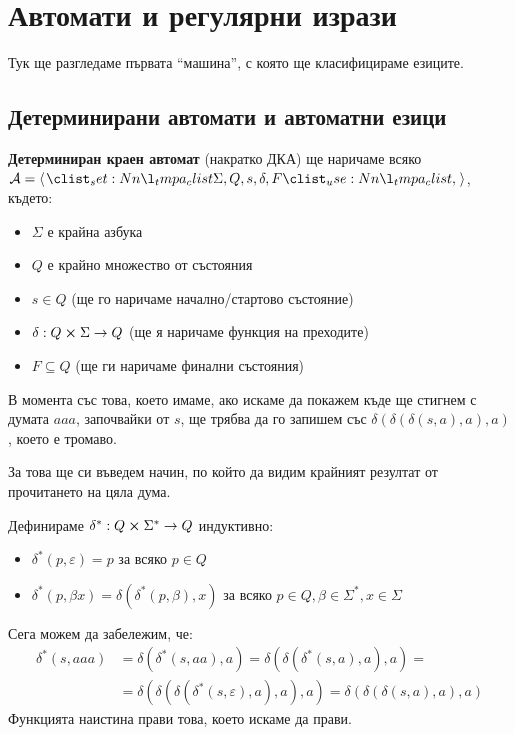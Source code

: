 \chapter{Автомати и регулярни изрази}

Тук ще разгледаме първата ``машина'', с която ще класифицираме езиците.

\section{Детерминирани автомати и автоматни езици}

\begin{definition}
    \textbf{Детерминиран краен автомат} (накратко ДКА) ще наричаме всяко $\mathcal{A} = \opair{\Sigma, Q, s, \delta, F}$, където:
    \begin{itemize}
        \item $\Sigma$ е крайна азбука
        \item $Q$ е крайно множество от състояния
        \item $s \in Q$ (ще го наричаме начално/стартово състояние)
        \item $\delta : Q \cross \Sigma \rightarrow Q$ (ще я наричаме функция на преходите)
        \item $F \subseteq Q$ (ще ги наричаме финални състояния)
    \end{itemize}
\end{definition}

В момента със това, което имаме,
ако искаме да покажем къде ще стигнем с думата $aaa$, започвайки от $s$,
ще трябва да го запишем със $\delta(\delta(\delta(s, a), a), a)$, което е тромаво.

За това ще си въведем начин, по който да видим крайният резултат от прочитането на цяла дума.

\begin{definition}
    Дефинираме $\delta^* : Q \cross \Sigma^* \rightarrow Q$ индуктивно:
    \begin{itemize}
        \item $\delta^*(p, \varepsilon) = p$ за всяко $p \in Q$
        \item $\delta^*(p, \beta x) = \delta(\delta^*(p, \beta), x)$ за всяко $p \in Q, \beta \in \Sigma^*, x \in \Sigma$
    \end{itemize}
\end{definition}

Сега можем да забележим, че:
\begin{align*}
    \delta^*(s, aaa) & = \delta(\delta^*(s, aa), a) = \delta(\delta(\delta^*(s, a), a), a) =                           \\
                     & = \delta(\delta(\delta(\delta^*(s, \varepsilon), a), a), a) =\delta(\delta(\delta(s, a), a), a)
\end{align*}
Функцията наистина прави това, което искаме да прави.

